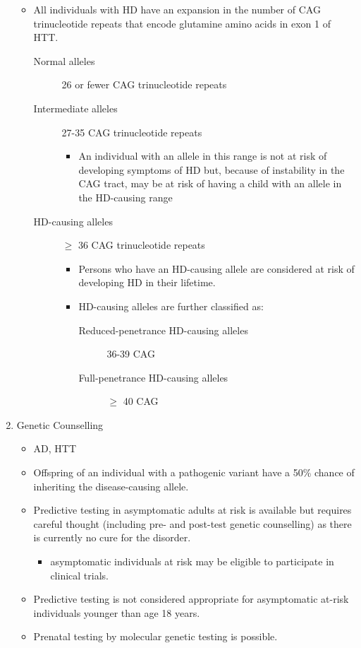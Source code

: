 \documentclass[12pt]{scrartcl}
\begin{document}
\begin{enumerate}
\begin{itemize}
\item All individuals with HD have an expansion in the number of CAG
trinucleotide repeats that encode glutamine amino acids in exon 1 of
HTT.
\begin{description}
\item[{Normal alleles}] 26 or fewer CAG trinucleotide repeats
\item[{Intermediate alleles}] 27-35 CAG trinucleotide repeats
\begin{itemize}
\item An individual with an allele in this range is not at risk of
developing symptoms of HD but, because of instability in the CAG
tract, may be at risk of having a child with an allele in the
HD-causing range
\end{itemize}
\item[{HD-causing alleles}] \(\ge\) 36 CAG trinucleotide repeats
\begin{itemize}
\item Persons who have an HD-causing allele are considered at risk of
developing HD in their lifetime.
\item HD-causing alleles are further classified as:
\begin{description}
\item[{Reduced-penetrance HD-causing alleles}] 36-39 CAG
\item[{Full-penetrance HD-causing alleles}] \(\ge\) 40 CAG
\end{description}
\end{itemize}
\end{description}
\end{itemize}
\item Genetic Counselling
\label{sec:orgbe63a5e}
\begin{itemize}
\item AD, HTT
\item Offspring of an individual with a pathogenic variant have a 50\% chance of inheriting the disease-causing allele.
\item Predictive testing in asymptomatic adults at risk is available but requires careful thought (including pre- and post-test genetic counselling) as there is currently no cure for the disorder.
\begin{itemize}
\item asymptomatic individuals at risk may be eligible to participate in clinical trials.
\end{itemize}
\item Predictive testing is not considered appropriate for asymptomatic at-risk individuals younger than age 18 years.
\item Prenatal testing by molecular genetic testing is possible.
\end{itemize}
\end{enumerate}
\end{document}
